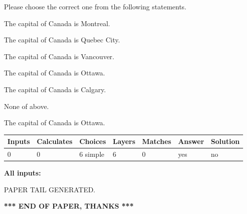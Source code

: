 \documentclass[12pt]{article}
\begin{document}
  
Please choose the correct one from the following statements.
 
 
The capital of Canada is Montreal.
 
 
The capital of Canada is Quebec City.
 
 
The capital of Canada is Vancouver.
 
 
The capital of Canada is Ottawa.
 
 
The capital of Canada is Calgary.
 
 
 None of above.
 
 
\noindent{}
 
 
The capital of Canada is Ottawa.
 
 
\noindent{}
 
 
   
   
   
   
\noindent\begin{tabular}{|l|l|l|l|l|l|l|}
 \hline
Inputs & Calculates & Choices & Layers & Matches & Answer & Solution \\ \hline
 0  & 
 0  & 
 6
  simple  
  & 
 6  & 
 0  & 
  yes & 
  no 
  \\ \hline
 \end{tabular}
   
   
   
   
\noindent{}
   
   
   
   
\noindent\vspace{0.1in}\hspace{-0.08in} {\textbf{\Large{All inputs: }}}
   
   
   
   
   
   
 \vspace{0.2in}
 
   
   
\vspace{2.0in} PAPER TAIL GENERATED.
   
   
   
   
\vspace{1.0in} 
{\textbf{\large{ *** END OF PAPER, THANKS *** }}} 
   
\end{document}
